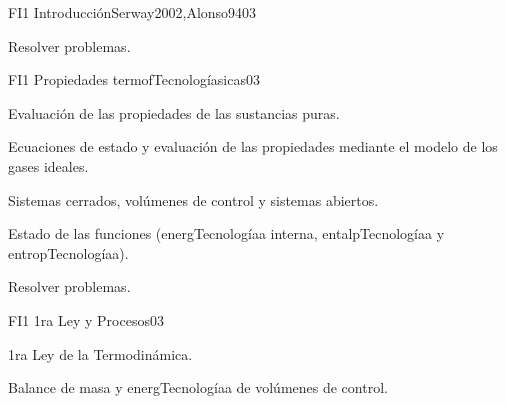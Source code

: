 \begin{syllabus}
\begin{unit}{FI1 Introducción}{Serway2002,Alonso94}{0}{3}
\begin{topics}

   \end{topics}

   \begin{learningoutcomes}
      \item Resolver problemas.
   \end{learningoutcomes}
\end{unit}

\begin{unit}{FI1 Propiedades termofTecnologíasicas}{}{0}{3}
\begin{topics}
      \item Evaluación de las propiedades de las sustancias puras.
      \item Ecuaciones de estado y evaluación de las propiedades mediante el modelo de los gases ideales.
      \item Sistemas cerrados, volúmenes de control y sistemas abiertos.
      \item Estado de las funciones (energTecnologíaa interna, entalpTecnologíaa y entropTecnologíaa).
  
  
  
  
   \end{topics}

   \begin{learningoutcomes}
      \item Resolver problemas.
   \end{learningoutcomes}
\end{unit}

\begin{unit}{FI1 1ra Ley y Procesos}{}{0}{3}
\begin{topics}
      \item 1ra Ley de la Termodinámica.
      \item Balance de masa y energTecnologíaa de volúmenes de control.
      
      
      
   \end{topics}


\end{unit}
\end{syllabus}
